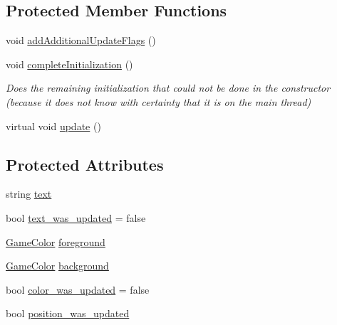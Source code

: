 \subsection*{Protected Member Functions}
\begin{DoxyCompactItemize}
\item 
void \hyperlink{class_text_output_a2f79d90f6d31ff248fde34f455cf7e16}{add\-Additional\-Update\-Flags} ()
\item 
void \hyperlink{class_text_output_a77b70d1145a189362996cd6b308e7dde}{complete\-Initialization} ()
\begin{DoxyCompactList}\small\item\em Does the remaining initialization that could not be done in the constructor (because it does not know with certainty that it is on the main thread) \end{DoxyCompactList}\item 
virtual void \hyperlink{class_text_output_a0fc3ebc814aa43df128bc6fcc80f5560}{update} ()
\end{DoxyCompactItemize}
\subsection*{Protected Attributes}
\begin{DoxyCompactItemize}
\item 
string \hyperlink{class_text_output_aa63e4c0936ed44ad8658f9567acd437b}{text}
\item 
bool \hyperlink{class_text_output_a01eda9d47821115d2389cc874867f2f5}{text\-\_\-was\-\_\-updated} = false
\item 
\hyperlink{struct_game_color}{Game\-Color} \hyperlink{class_text_output_a969669fc87e0828685b6b20c4bb79616}{foreground}
\item 
\hyperlink{struct_game_color}{Game\-Color} \hyperlink{class_text_output_a1d58e4651de9d729bdc19f143b2bb042}{background}
\item 
bool \hyperlink{class_text_output_abb92f5a8c0c871c8b917f441567d9cae}{color\-\_\-was\-\_\-updated} = false
\item 
bool \hyperlink{class_text_output_a51e0f91233dbf52332b3562ab72aca28}{position\-\_\-was\-\_\-updated}
\end{DoxyCompactItemize}
